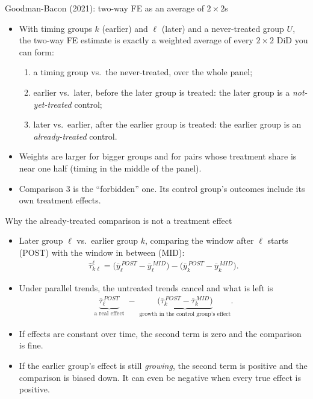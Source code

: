 \documentclass[aspectratio=169,11pt]{beamer}
\begin{document}
\begin{frame}{Goodman-Bacon (2021): two-way FE as an average of $2\times2$s}
\begin{itemize}
	\item With timing groups $k$ (earlier) and $\ell$ (later) and a never-treated group $U$, the two-way FE estimate is
	\alert{exactly} a weighted average of every $2\times2$ DiD you can form:
	\begin{enumerate}
		\item a timing group vs.\ the never-treated, over the whole panel;
		\item earlier vs.\ later, before the later group is treated: the later group is a \emph{not-yet-treated} control;
		\item later vs.\ earlier, after the earlier group is treated: the earlier group is an \emph{already-treated} control.
	\end{enumerate}
	\medskip
	\item Weights are larger for bigger groups and for pairs whose treatment share is near one half (timing in
	the middle of the panel).
	\medskip
	\item Comparison 3 is the ``forbidden'' one. Its control group's outcomes include its own treatment effects.
\end{itemize}
\end{frame}


\begin{frame}{Why the already-treated comparison is not a treatment effect}
\small
\begin{itemize}
	\item Later group $\ell$ vs.\ earlier group $k$, comparing the window after $\ell$ starts (POST) with the window in between (MID):
	\begin{align*}
		\hat\tau^{\ell}_{k\ell}
		= \big(\bar y_\ell^{\,POST} - \bar y_\ell^{\,MID}\big) - \big(\bar y_k^{\,POST} - \bar y_k^{\,MID}\big).
	\end{align*}
	\item Under parallel trends, the untreated trends cancel and what is left is
	\begin{align*}
		\underbrace{\bar\tau_\ell^{\,POST}}_{\text{a real effect}}
		\;-\; \underbrace{\big(\bar\tau_k^{\,POST} - \bar\tau_k^{\,MID}\big)}_{\text{growth in the control group's effect}}.
	\end{align*}
	\item If effects are constant over time, the second term is zero and the comparison is fine.
	\item If the earlier group's effect is still \emph{growing}, the second term is positive and the comparison is biased
	down. It can even be negative when every true effect is positive.
\end{itemize}
\end{frame}
\end{document}
